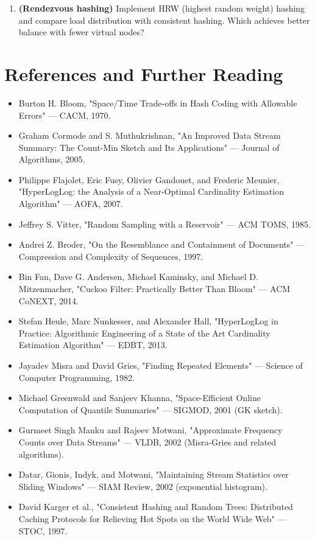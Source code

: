 \begin{enumerate}
\item \textbf{(Rendezvous hashing)} Implement HRW (highest random weight) hashing and compare load distribution with consistent hashing. Which achieves better balance with fewer virtual nodes?
\end{enumerate}

\section{References and Further Reading}

\begin{itemize}
\item Burton H. Bloom, "Space/Time Trade-offs in Hash Coding with Allowable Errors" — CACM, 1970.
\item Graham Cormode and S. Muthukrishnan, "An Improved Data Stream Summary: The Count-Min Sketch and Its Applications" — Journal of Algorithms, 2005.
\item Philippe Flajolet, Eric Fusy, Olivier Gandouet, and Frederic Meunier, "HyperLogLog: the Analysis of a Near-Optimal Cardinality Estimation Algorithm" — AOFA, 2007.
\item Jeffrey S. Vitter, "Random Sampling with a Reservoir" — ACM TOMS, 1985.
\item Andrei Z. Broder, "On the Resemblance and Containment of Documents" — Compression and Complexity of Sequences, 1997.
\item Bin Fan, Dave G. Andersen, Michael Kaminsky, and Michael D. Mitzenmacher, "Cuckoo Filter: Practically Better Than Bloom" — ACM CoNEXT, 2014.
\item Stefan Heule, Marc Nunkesser, and Alexander Hall, "HyperLogLog in Practice: Algorithmic Engineering of a State of the Art Cardinality Estimation Algorithm" — EDBT, 2013.
\item Jayadev Misra and David Gries, "Finding Repeated Elements" — Science of Computer Programming, 1982.
\item Michael Greenwald and Sanjeev Khanna, "Space-Efficient Online Computation of Quantile Summaries" — SIGMOD, 2001 (GK sketch).
\item Gurmeet Singh Manku and Rajeev Motwani, "Approximate Frequency Counts over Data Streams" — VLDB, 2002 (Misra-Gries and related algorithms).
\item Datar, Gionis, Indyk, and Motwani, "Maintaining Stream Statistics over Sliding Windows" — SIAM Review, 2002 (exponential histogram).
\item David Karger et al., "Consistent Hashing and Random Trees: Distributed Caching Protocols for Relieving Hot Spots on the World Wide Web" — STOC, 1997.

\end{itemize}
